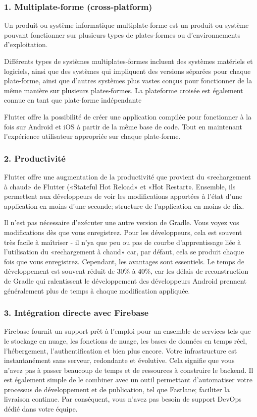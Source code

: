\subsubsection{1. Multiplate-forme (cross-platform)}
Un produit ou système informatique multiplate-forme est un produit ou système pouvant fonctionner sur plusieurs types de plates-formes ou d'environnements d'exploitation.

Différents types de systèmes multiplates-formes incluent des systèmes matériels et logiciels, ainsi que des systèmes qui impliquent des versions séparées pour chaque plate-forme, ainsi que d'autres systèmes plus vastes conçus pour fonctionner de la même manière sur plusieurs plates-formes.
La plateforme croisée est également connue en tant que plate-forme indépendante\cite{noauthor_what_nodate}

Flutter offre la possibilité de créer une application compilée pour fonctionner à la fois sur Android et iOS à partir de la même base de code. Tout en maintenant l'expérience utilisateur appropriée sur chaque plate-forme.


\subsubsection{2. Productivité}
Flutter offre une augmentation de la productivité que provient du «rechargement à chaud» de Flutter («Stateful Hot Reload» et «Hot Restart». Ensemble, ils permettent aux développeurs de voir les modifications apportées à l'état d'une application en moins d'une seconde; structure de l'application en moins de dix.

Il n’est pas nécessaire d’exécuter une autre version de Gradle. Vous voyez vos modifications dès que vous enregistrez. Pour les développeurs, cela est souvent très facile à maîtriser - il n’ya que peu ou pas de courbe d’apprentissage liée à l’utilisation du «rechargement à chaud» car, par défaut, cela se produit chaque fois que vous enregistrez. Cependant, les avantages sont essentiels. Le temps de développement est souvent réduit de 30\% à 40\%, car les délais de reconstruction de Gradle qui ralentissent le développement des développeurs Android prennent généralement plus de temps à chaque modification appliquée.

\subsubsection{3. Intégration directe avec Firebase}
Firebase fournit un support prêt à l'emploi pour un ensemble de services tels que le stockage en nuage, les fonctions de nuage, les bases de données en temps réel, l'hébergement, l'authentification et bien plus encore. Votre infrastructure est instantanément sans serveur, redondante et évolutive. Cela signifie que vous n’avez pas à passer beaucoup de temps et de ressources à construire le backend. Il est également simple de le combiner avec un outil permettant d’automatiser votre processus de développement et de publication, tel que Fastlane; faciliter la livraison continue. Par conséquent, vous n'avez pas besoin de support DevOps dédié dans votre équipe.

